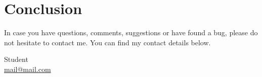 \chapter{Conclusion}\label{ch:conclusion}
In case you have questions, comments, suggestions or have found a bug, please do not hesitate to contact me. You can find my contact details below.
  \begin{center}
    Student\\
    \href{mailto: mail@mail.com}{mail@mail.com}\\
  \end{center}
